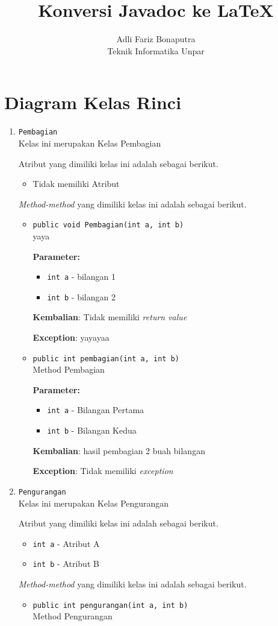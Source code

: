 \documentclass{article}
\title{\textbf{Konversi Javadoc ke \LaTeX}}
\author{Adli Fariz Bonaputra \\ Teknik Informatika Unpar}
\begin{document}
\maketitle
\section{Diagram Kelas Rinci}
\begin{enumerate}
\item \texttt{Pembagian}\\ 
Kelas ini merupakan Kelas Pembagian

Atribut yang dimiliki kelas ini adalah sebagai berikut.
\begin{itemize}
\item Tidak memiliki Atribut
\end{itemize}
\textit{Method-method} yang dimiliki kelas ini adalah sebagai berikut.
\begin{itemize}
\item \texttt{public void Pembagian(int a, int b)}\\ 
yaya

\textbf{Parameter:}
\begin{itemize}
\item \texttt{int a} - 
bilangan 1
\item \texttt{int b} - 
bilangan 2
\end{itemize}
\textbf{Kembalian}: Tidak memiliki \textit{return value}

\textbf{Exception}: yayayaa

\item \texttt{public int pembagian(int a, int b)}\\ 
Method Pembagian

\textbf{Parameter:}
\begin{itemize}
\item \texttt{int a} - 
Bilangan Pertama
\item \texttt{int b} - 
Bilangan Kedua
\end{itemize}
\textbf{Kembalian}: hasil pembagian 2 buah bilangan

\textbf{Exception}: Tidak memiliki \textit{exception}

\end{itemize}
\item \texttt{Pengurangan}\\ 
Kelas ini merupakan Kelas Pengurangan

Atribut yang dimiliki kelas ini adalah sebagai berikut.
\begin{itemize}
\item \texttt{int a} - Atribut A
\item \texttt{int b} - Atribut B
\end{itemize}
\textit{Method-method} yang dimiliki kelas ini adalah sebagai berikut.
\begin{itemize}
\item \texttt{public int pengurangan(int a, int b)}\\ 
Method Pengurangan


\end{itemize}
\end{enumerate}
\end{document}
